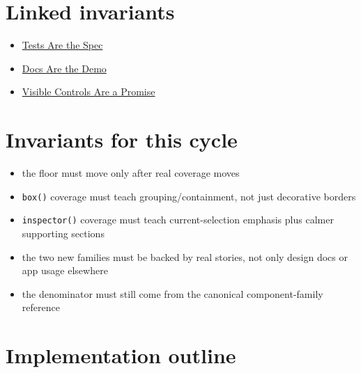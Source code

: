 \section{Linked invariants}\label{record-068-linked-invariants}

\begin{itemize}
\tightlist
\item
  \href{https://github.com/flyingrobots/bijou/blob/cbd70612140e7a450d764b3c7be1c6af878b99bc/docs/invariants/tests-are-the-spec.md}{Tests Are the Spec}
\item
  \href{https://github.com/flyingrobots/bijou/blob/cbd70612140e7a450d764b3c7be1c6af878b99bc/docs/invariants/docs-are-the-demo.md}{Docs Are the Demo}
\item
  \href{https://github.com/flyingrobots/bijou/blob/cbd70612140e7a450d764b3c7be1c6af878b99bc/docs/invariants/visible-controls-are-a-promise.md}{Visible Controls Are a Promise}
\end{itemize}

\section{Invariants for this cycle}\label{record-068-invariants-for-this-cycle}

\begin{itemize}
\tightlist
\item
  the floor must move only after real coverage moves
\item
  \texttt{b\allowbreak{}o\allowbreak{}x\allowbreak{}(\allowbreak{})} coverage must teach grouping/containment, not just decorative borders
\item
  \texttt{i\allowbreak{}n\allowbreak{}s\allowbreak{}p\allowbreak{}e\allowbreak{}c\allowbreak{}t\allowbreak{}o\allowbreak{}r\allowbreak{}(\allowbreak{})} coverage must teach current-selection emphasis plus calmer supporting sections
\item
  the two new families must be backed by real stories, not only design docs or app usage elsewhere
\item
  the denominator must still come from the canonical component-family reference
\end{itemize}

\section{Implementation outline}\label{record-068-implementation-outline}

